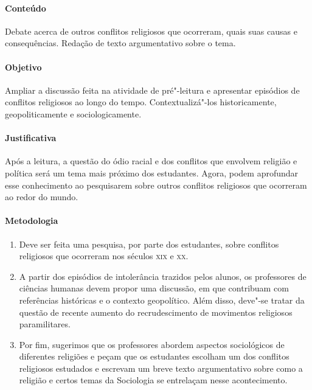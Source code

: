 \documentclass[12pt]{extarticle}
\begin{document}
\paragraph{Conteúdo} Debate acerca de outros conflitos religiosos
que ocorreram, quais suas causas e consequências. Redação de texto
argumentativo sobre o tema.

\paragraph{Objetivo} Ampliar a discussão feita na atividade de pré"-leitura
e apresentar episódios de conflitos religiosos ao longo do tempo.
Contextualizá"-los historicamente, geopoliticamente e sociologicamente.

\paragraph{Justificativa} Após a leitura, a questão do ódio racial e dos
conflitos que envolvem religião e política será um tema mais próximo dos estudantes.
Agora, podem aprofundar esse conhecimento ao pesquisarem sobre outros conflitos 
religiosos que ocorreram ao redor do mundo.

\paragraph{Metodologia}

\begin{enumerate}

\item Deve ser feita uma pesquisa, por parte dos estudantes, sobre
conflitos religiosos que ocorreram nos séculos \textsc{xix} e \textsc{xx}. 

\item A partir dos episódios de intolerância trazidos pelos 
alunos, os professores de ciências humanas devem propor uma discussão,
em que contribuam com referências históricas e o contexto geopolítico.
Além disso, deve"-se tratar da questão de recente aumento do
recrudescimento de movimentos religiosos
paramilitares. 

\item Por fim, sugerimos que os professores abordem
aspectos sociológicos de diferentes
religiões e peçam que os estudantes escolham um 
dos conflitos religiosos estudados e escrevam um
breve texto argumentativo sobre como a religião
e certos temas da Sociologia se entrelaçam nesse acontecimento.

\end{enumerate}
\end{document}
